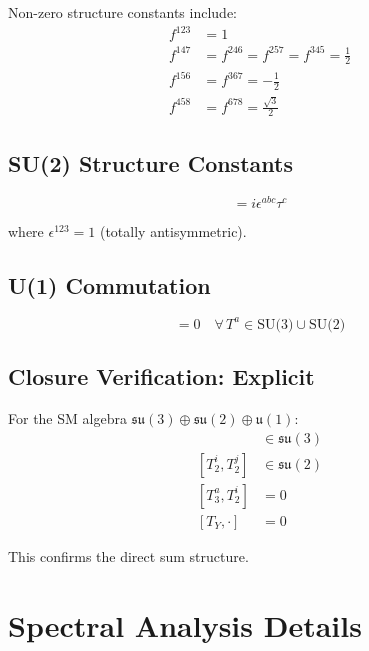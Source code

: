 \documentclass[11pt,a4paper]{article}
\begin{document}
Non-zero structure constants include:
\begin{align}
  f^{123} &= 1
  \label{eq:f123} \\
  f^{147} &= f^{246} = f^{257} = f^{345} = \frac{1}{2}
  \label{eq:f147} \\
  f^{156} &= f^{367} = -\frac{1}{2}
  \label{eq:f156} \\
  f^{458} &= f^{678} = \frac{\sqrt{3}}{2}
  \label{eq:f458}
\end{align}

\subsection{SU(2) Structure Constants}

\begin{equation}
  [\tau^a, \tau^b] = i \epsilon^{abc} \tau^c
  \label{eq:app-su2-commutator}
\end{equation}

where $\epsilon^{123} = 1$ (totally antisymmetric).

\subsection{U(1) Commutation}

\begin{equation}
  [T_Y, T^a] = 0 \quad \forall\, T^a \in \text{SU(3)} \cup \text{SU(2)}
  \label{eq:app-u1-commutation}
\end{equation}

\subsection{Closure Verification: Explicit}

For the SM algebra $\mathfrak{su}(3) \oplus \mathfrak{su}(2) \oplus \mathfrak{u}(1)$:
\begin{align}
  [T^a_3, T^b_3] &\in \mathfrak{su}(3)
  \label{eq:closure-su3} \\
  [T^i_2, T^j_2] &\in \mathfrak{su}(2)
  \label{eq:closure-su2} \\
  [T^a_3, T^i_2] &= 0
  \label{eq:closure-cross} \\
  [T_Y, \cdot] &= 0
  \label{eq:closure-u1}
\end{align}

This confirms the direct sum structure.

\section{Spectral Analysis Details}
\label{app:spectral}
\end{document}
